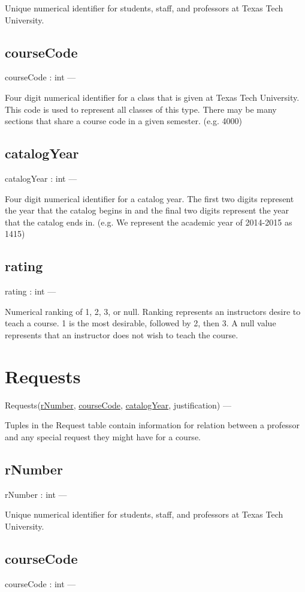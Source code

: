 \documentclass[10pt]{article}
\begin{document}
	Unique numerical identifier for students, staff, and professors at Texas Tech University.
	
	\subsection{courseCode}
	courseCode : int ---
	
	Four digit numerical identifier for a class that is given at Texas Tech University. This code is used to represent all classes of this type. There may be many sections that share a course code in a given semester. (e.g. 4000)
	
	\subsection{catalogYear}
	catalogYear : int ---
	
	Four digit numerical identifier for a catalog year. The first two digits represent the year that the catalog begins in and the final two digits represent the year that the catalog ends in. (e.g. We represent the academic year of 2014-2015 as 1415)
	
	\subsection{rating}
	rating : int --- 
	
	Numerical ranking of 1, 2, 3, or null. Ranking represents an instructors desire to teach a course. 1 is the most desirable, followed by 2, then 3. A null value represents that an instructor does not wish to teach the course. 


\section{Requests}
Requests(\underline{rNumber}, \underline{courseCode}, \underline{catalogYear}, justification) ---

Tuples in the Request table contain information for relation between a professor and any special request they might have for a course.
	
	\subsection{rNumber}
	rNumber : int ---
	
	Unique numerical identifier for students, staff, and professors at Texas Tech University.
	
	\subsection{courseCode}
	courseCode : int ---
	
\end{document}
